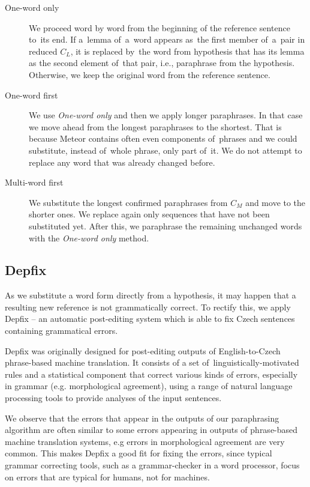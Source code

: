 \documentclass[11pt]{article}
\begin{document}
\begin{description}
\item[One-word only] We proceed word by word from the beginning of the reference 
sentence to~its end. If a~lemma of~a~word appears as~the first member of~a~pair 
in reduced $ C_{L} $, it is replaced by~the word from hypothesis that has its lemma
as the second element of~that pair, i.e., paraphrase from the hypothesis. Otherwise, 
we keep the original word from the reference sentence.
\item[One-word first] We use \textit{One-word only} and then we apply longer paraphrases.
In that case we move ahead from the longest paraphrases to the shortest. That is because 
Meteor contains often even components of~phrases and we could substitute, instead of~whole 
phrase, only part of~it. We do not attempt to replace any word that was already changed 
before.
\item[Multi-word first] We substitute the longest confirmed paraphrases from
$ C_{M} $ and move to the shorter ones. We replace again only sequences that have not
been substituted yet. After this, we paraphrase the remaining unchanged words
with the \textit{One-word only} method.
\end{description}

\subsection{Depfix}
As we substitute a word form directly from a hypothesis, it may happen that a resulting
new reference is not grammatically correct. To rectify this, we apply Depfix \cite{depfix} 
-- an automatic post-editing system which is able to fix Czech sentences containing 
grammatical errors.

Depfix was originally designed for post-editing outputs of English-to-Czech 
phrase-based machine translation. It consists of a set of~linguistically-motivated rules 
and a statistical component that correct various kinds of errors, especially in grammar 
(e.g. morphological agreement), using a range of natural language processing tools to 
provide analyses of the input sentences.

We observe that the errors that appear in the outputs of our paraphrasing algorithm are 
often similar to some errors appearing in outputs of phrase-based machine translation systems, 
e.g errors in morphological agreement are very common. This makes Depfix a good fit for fixing 
the errors, since typical grammar correcting tools, such as a grammar-checker in a word processor, 
focus on errors that are typical for humans, not for machines. 
\end{document}

